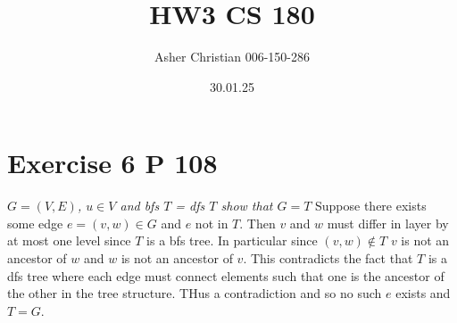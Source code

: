 \documentclass{amsart}
\title{HW3 CS 180}
\author{Asher Christian 006-150-286}
\date{ 30.01.25}
\begin{document}
\maketitle
\section{Exercise 6 P 108}
\emph{
    $G = (V,E)$,  $u \in V$ and bfs  $T$ = dfs  $T$ show that $G = T$
}
Suppose there exists some edge $e = (v,w) \in G$ and $e$ not in  $T$. Then
$v$ and $w$ must differ in layer by at most one level since $T$ is a bfs tree. In particular since 
$(v,w) \not\in T$  $v$ is not an ancestor of $w$ and $w$ is not an ancestor of $v$.
This contradicts the fact that $T$ is a dfs tree where each edge must connect 
elements such that one is the ancestor of the other in the tree structure. THus a contradiction
and so no such $e$ exists and $T = G$. 
\end{document}
